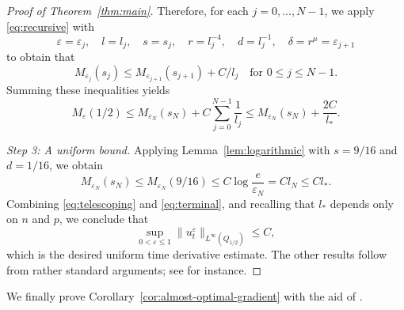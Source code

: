 \documentclass[a4paper,11pt]{amsart}
\theoremstyle{plain}
\theoremstyle{definition}
\numberwithin{equation}{section}
\begin{document}
\begin{proof}[Proof of Theorem~\ref{thm:main}]
Therefore, for each $j=0,\ldots,N-1$, we apply \eqref{eq:recursive} with
\begin{equation*}
\varepsilon=\varepsilon_j,\quad l=l_j,\quad s=s_j,\quad r=l_j^{-4},\quad d=l_j^{-1},\quad \delta=r^\mu=\varepsilon_{j+1}
\end{equation*}
to obtain that
\begin{equation*}
M_{\varepsilon_j}(s_j) \leq M_{\varepsilon_{j+1}}(s_{j+1})+C/l_j \quad \text{for $0\leq j \leq N-1$}.
\end{equation*}
Summing these inequalities yields
\begin{equation}\label{eq:telescoping}
M_\varepsilon(1/2)\leq M_{\varepsilon_N}(s_N)
+C\sum_{j=0}^{N-1}\frac1{l_j}\leq M_{\varepsilon_N}(s_N)+\frac{2C}{l_{\ast}}.
\end{equation}

\smallskip\noindent\textit{Step 3: A uniform bound.}
Applying Lemma~\ref{lem:logarithmic} with $s=9/16$ and $d=1/16$, we obtain
\begin{equation}\label{eq:terminal}
M_{\varepsilon_N}(s_N)
\leq M_{\varepsilon_N}(9/16)
\leq C\log\frac e{\varepsilon_N}
=Cl_N\leq Cl_{\ast}.
\end{equation}
Combining \eqref{eq:telescoping} and \eqref{eq:terminal},
and recalling that $l_{\ast}$ depends only on $n$ and $p$,
we conclude that
\begin{equation*}
\sup_{0<\varepsilon\leq1}\|u_t^\varepsilon\|_{L^\infty(Q_{1/2})}\leq C,
\end{equation*}
which is the desired uniform time derivative estimate. The other results follow from rather standard arguments; see \cite{LLYZ25} for instance.
\end{proof}

We finally prove Corollary~\ref{cor:almost-optimal-gradient} with the aid of \cite[Theorem~1.3]{APR17}.
\end{document}
